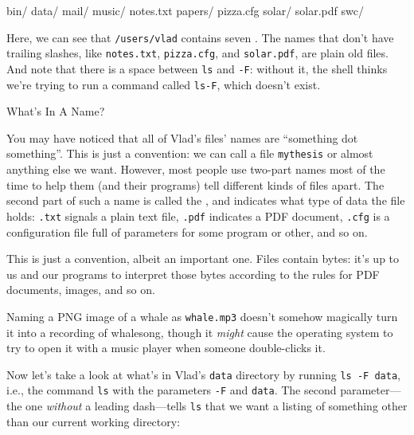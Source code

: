 
\begin{VerbOut}
bin/         data/     mail/      music/
notes.txt    papers/   pizza.cfg  solar/
solar.pdf    swc/
\end{VerbOut}

Here, we can see that \texttt{/users/vlad} contains seven
. The names that don't have
trailing slashes, like \texttt{notes.txt}, \texttt{pizza.cfg}, and
\texttt{solar.pdf}, are plain old files. And note that there is a space
between \texttt{ls} and \texttt{-F}: without it, the shell thinks we're
trying to run a command called \texttt{ls-F}, which doesn't exist.

\begin{swcbox}{What's In A Name?}

You may have noticed that all of Vlad's files' names are ``something dot
something''. This is just a convention: we can call a file
\texttt{mythesis} or almost anything else we want. However, most people
use two-part names most of the time to help them (and their programs)
tell different kinds of files apart. The second part of such a name is
called the , and
indicates what type of data the file holds: \texttt{.txt} signals a
plain text file, \texttt{.pdf} indicates a PDF document, \texttt{.cfg}
is a configuration file full of parameters for some program or other,
and so on.

This is just a convention, albeit an important one. Files contain bytes:
it's up to us and our programs to interpret those bytes according to the
rules for PDF documents, images, and so on.

Naming a PNG image of a whale as \texttt{whale.mp3} doesn't somehow
magically turn it into a recording of whalesong, though it \emph{might}
cause the operating system to try to open it with a music player when
someone double-clicks it.

\end{swcbox}

Now let's take a look at what's in Vlad's \texttt{data} directory by
running \texttt{ls -F data}, i.e., the command \texttt{ls} with the
parameters \texttt{-F} and \texttt{data}. The second parameter---the one
\emph{without} a leading dash---tells \texttt{ls} that we want a listing
of something other than our current working directory:

